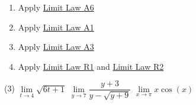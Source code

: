 \documentclass[12pt,]{book}
\theoremstyle{plain}
\theoremstyle{definition}
\numberwithin{equation}{section}
\begin{document}
\begin{multicols}{2}
\begin{enumerate}[label=(\alph*)]
\item{}Apply \hyperref[lla6]{Limit Law A6}%
\item{}Apply \hyperref[lla1]{Limit Law A1}%
\item{}Apply \hyperref[lla3]{Limit Law A3}%
\item{}Apply \hyperref[llr1]{Limit Law R1} and \hyperref[llr2]{Limit Law R2}%
\end{enumerate}
\end{multicols}
\par
\begin{exercisegroup}(3)
\exercise[4.]\hypertarget{exercise-first-apply-limit-laws}{\null}\(\lim\limits_{t\to4}\sqrt{6t+1}\)%
\exercise[5.]\hypertarget{exercise-70}{\null}\(\lim\limits_{y\to7}\dfrac{y+3}{y-\sqrt{y+9}}\)%
\exercise[6.]\hypertarget{exercise-71}{\null}\(\lim\limits_{x\to\pi}x\cos(x)\)%
\end{exercisegroup}
\par\smallskip\noindent
\typeout{************************************************}
\typeout{************************************************}
\end{document}
